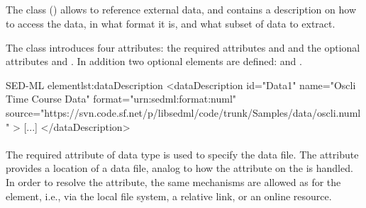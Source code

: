 \subsection{}
\label{class:dataDescription}

The  class () allows to reference external data, and contains a description on how to access the data, in what format it is, and what subset of data to extract. 


The  class introduces four attributes: the required attributes \hyperref[sec:id]{} and \hyperref[sec:data_source]{} and the optional attributes \hyperref[sec:format]{} and \hyperref[sec:name]{}. In addition two optional elements are defined: \hyperref[sec:dimensionDescription]{} and \hyperref[class:listOfDataSources]{}. 

\begin{myXmlLst}{SED-ML  element}{lst:dataDescription}
<dataDescription id="Data1" name="Oscli Time Course Data" format="urn:sedml:format:numl"
	source="https://svn.code.sf.net/p/libsedml/code/trunk/Samples/data/oscli.numl" >
    [...]
</dataDescription>
\end{myXmlLst} 

\paragraph*{}
\label{sec:data_source}
The required  attribute of data type \hyperref[type:anyURI]{} is used to specify the data file. The  attribute provides a location of a data file, 
analog to how the \hyperref[sec:model_source]{} attribute on the \SedModel is handled. In order to resolve the  attribute, the same mechanisms are allowed as for the \SedModel \hyperref[sec:model_source]{} element, i.e., via the local file system, a relative link, or an online resource.


